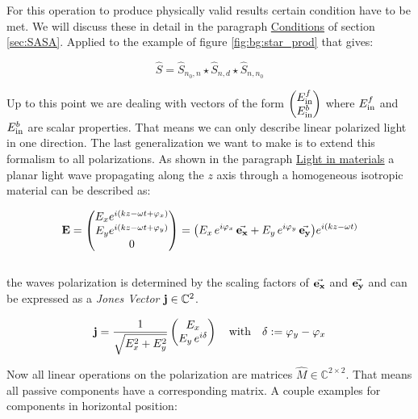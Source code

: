 For this operation to produce physically valid results certain condition have to be met. We will discuss these in detail in the paragraph \hyperref[par:conditions]{Conditions} of section \ref{sec:SASA}.
Applied to the example of figure \ref{fig:bg:star_prod} that gives:

\begin{equation}
    \hat S = \hat S_{n_0, n} \star \hat S_{n, d} \star \hat S_{n, n_0}
\end{equation}

Up to this point we are dealing with vectors of the form
$
\begin{pmatrix}
    E^f_{\mathrm{in}} \\
    E^b_{\mathrm{in}}
\end{pmatrix}
$
where $E^f_{\mathrm{in}}$ and $E^b_{\mathrm{in}}$ are scalar properties. That means we can only describe linear polarized light in one direction. The last generalization we want to make is to extend this formalism to all polarizations. As shown in the paragraph \hyperref[par:light_in_materials]{Light in materials} a planar light wave propagating along the $z$ axis through a homogeneous isotropic material can be described as:

\begin{equation}
   \vb E =
   \begin{pmatrix}
       E_x e^{i(kz - \omega t + \varphi_x)}\\
       E_y e^{i(kz - \omega t + \varphi_y)}\\
       0\\
   \end{pmatrix}
   =
   \qty(E_x \, e^{i \varphi_x} \, \va{e_x} +
        E_y \, e^{i \varphi_y} \, \va{e_y})
       e^{i(kz - \omega t)}
\end{equation}
\\

\noindent
the waves polarization is determined by the scaling factors of $\va{e_x}$ and $\va{e_y}$ and can be expressed as a \textit{Jones Vector} $\vb j \in \mathbb{C}^2$.

\begin{equation}
   \vb j = \frac{1}{\sqrt{E_x^2 + E_y^2}}
   \begin{pmatrix}
       E_x\\
       E_y \, e^{i \delta}
   \end{pmatrix}
   \qq{with}
   \delta := \varphi_y - \varphi_x
\end{equation}

\noindent
Now all linear operations on the polarization are matrices $\hat{M} \in \mathbb{C}^{2 \times 2}$. That means all passive components have a corresponding matrix. A couple examples for components in horizontal position:


